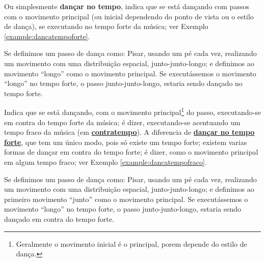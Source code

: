 \begin{definition} 
\label{def:DancaNoTempo}
Ou simplesmente \textbf{dançar no tempo}, indica que se está dançando com passos com o movimento principal 
(ou inicial dependendo do ponto de vista ou o estilo de dança), 
se executando no tempo forte da música; ver Exemplo \ref{example:dancatempoforte}.
\end{definition}
\begin{example}
\label{example:dancatempoforte}
Se definimos um passo de dança como: Pisar, usando um pé cada vez, 
realizando um movimento com uma distribuição espacial, junto-junto-longo;
e definimos ao movimento ``longo'' como o movimento principal. 
Se executássemos o movimento ``longo'' no tempo forte, o passo junto-junto-longo,
estaria sendo dançado no tempo forte.
\end{example}

\begin{definition} 
\label{def:DancaNoContratempo}
Indica que se está dançando, com o movimento principal\footnote{Geralmente o movimento inicial é o principal,
porem depende do estilo de dança.} do passo, 
executando-se em contra do tempo forte da música; é dizer, 
executando-se acentuando um tempo fraco da música (em \hyperref[sec:contratempo]{\textbf{contratempo}}).
A diferencia de \hyperref[def:DancaNoTempo]{\textbf{dançar no tempo forte}}, 
que tem um único modo, pois só existe um tempo forte;
existem varias formas de dançar em contra do tempo forte;
é dizer, como o movimento principal em algum tempo fraco; ver Exemplo \ref{example:dancatempofraco}.
\end{definition}
\begin{example}
\label{example:dancatempofraco}
Se definimos um passo de dança como: Pisar, usando um pé cada vez, 
realizando um movimento com uma distribuição espacial, junto-junto-longo;
e definimos ao primeiro movimento ``junto'' como o movimento principal. 
Se executássemos o movimento ``longo'' no tempo forte, o passo junto-junto-longo,
estaria sendo dançado em contra do tempo forte.
\end{example}
